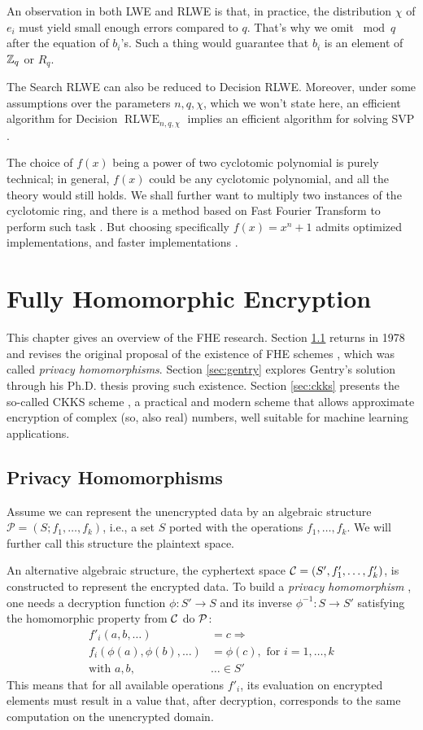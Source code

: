 An observation in both LWE and RLWE is that, in practice, the distribution $\chi$ of $e_i$ must yield small enough errors compared to $q$. That's why we omit $\bmod q$ after the equation of $b_i$'s. Such a thing would guarantee that $b_i$ is an element of $\mathbb{Z}_q$ or $R_q$.

The Search RLWE can also be reduced to Decision RLWE. Moreover, under some assumptions over the parameters $n,q,\chi$, which we won't state here, an efficient algorithm for Decision $\operatorname{RLWE}_{n,q,\chi}$ implies an efficient algorithm for solving SVP \cite{lyubashevsky10}.

The choice of $f(x)$ being a power of two cyclotomic polynomial is purely technical; in general, $f(x)$ could be any cyclotomic polynomial, and all the theory would still holds. We shall further want to multiply two instances of the cyclotomic ring, and there is a method based on Fast Fourier Transform to perform such task \cite{fftmult}. But choosing specifically $f(x)=x^n+1$ admits optimized implementations, and faster implementations \cite{swifft}.


\chapter{Fully Homomorphic Encryption}
This chapter gives an overview of the FHE research. Section \ref{sec:privhom} returns in 1978 and revises the original proposal of the existence of FHE schemes \cite{Rivest1978}, which was called \textit{privacy homomorphisms}. Section \ref{sec:gentry} explores Gentry's solution through his Ph.D. thesis \cite{gentry2009fully} proving such existence. Section \ref{sec:ckks} presents the so-called CKKS scheme \cite{ckks17}, a practical and modern scheme that allows approximate encryption of complex (so, also real) numbers, well suitable for machine learning applications. 

\section{Privacy Homomorphisms}
\label{sec:privhom}
Assume we can represent the unencrypted data by an algebraic structure $\mathcal P= (S;f_1,\ldots,f_k)$, i.e., a set $S$ ported with the operations $f_1,\ldots,f_k$. We will further call this structure the plaintext space.

An alternative algebraic structure, the cyphertext space $\mathcal C=(S',f'_1,\ldots,f'_k)$, is constructed to represent the encrypted data. To build a \textit{privacy homomorphism} \cite{Rivest1978},  one needs a decryption function $\phi:S'\to S$ and its inverse $\phi^{-1}:S\to S'$ satisfying the homomorphic property from $\mathcal C$ do $\mathcal P$:
\begin{align}
    \label{privhom}
    f'_i(a,b,\ldots)&=c\Rightarrow\nonumber\\ f_i(\phi(a),\phi(b),\ldots)&=\phi(c),\text{ for } i=1,\ldots,k\\
    \text{with }a,b,&\ldots\in S'\nonumber
\end{align}
This means that for all available operations $f'_i$, its evaluation on encrypted elements must result in a value that, after decryption, corresponds to the same computation on the unencrypted domain.


